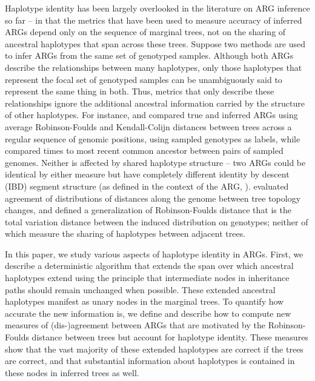 \documentclass[10pt,twoside,lineno]{gsajnl}
\begin{document}
Haplotype identity has been largely overlooked in the literature on ARG inference so far --
in that the metrics that have been used to measure accuracy of inferred ARGs
depend only on the sequence of marginal trees,
not on the sharing of ancestral haplotypes that span across these trees. %
Suppose two methods are used to infer ARGs from the same set of genotyped samples.
Although both ARGs describe the relationships between many haplotypes,
only those haplotypes that represent the focal set of genotyped samples %
can be unambiguously said to represent the same thing in both.
Thus, metrics that only describe these relationships
ignore the additional ancestral information carried by the structure of other haplotypes. %
For instance, \citet{kelleher2019inferring} and \citet{zhang2023biobankscale}
compared true and inferred ARGs
using average Robinson-Foulds and Kendall-Colijn distances between trees
across a regular sequence of genomic positions,
using sampled genotypes as labels,
while \citet{brandt2022evaluation} compared times to most recent common ancestor
between pairs of sampled genomes.
Neither is affected by shared haplotype structure --
two ARGs could be identical by either measure
but have completely different identity by descent (IBD) segment structure
(as defined in the context of the ARG, \citep{XXX}).
\citet{deng2021distribution} evaluated agreement of distributions of
distances along the genome between tree topology changes,
and \citet{zhang2023biobankscale} defined a generalization of Robinson-Foulds distance
that is the total variation distance between the induced distribution on genotypes;
neither of which measure the sharing of haplotypes between adjacent trees.

In this paper, we study various aspects of haplotype identity in ARGs.
First, we describe a deterministic algorithm that
extends the span over which ancestral haplotypes extend
using the principle that intermediate nodes in inheritance paths
should remain unchanged when possible.
These extended ancestral haplotypes manifest as unary nodes in the marginal trees.
To quantify how accurate the new information is,
we define and describe how to compute new measures of (dis-)agreement between ARGs
that are motivated by the Robinson-Foulds distance between trees
but account for haplotype identity.
These measures show that the vast majority of these extended haplotypes are correct if the trees are correct,
and that substantial information about haplotypes is contained in these nodes
in inferred trees as well.
\end{document}
